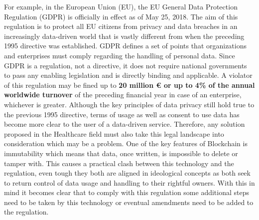 For example, in the European Union (EU), the EU General Data Protection
Regulation (GDPR) is officially in effect as of May 25, 2018. The aim of this
regulation is to protect all EU citizens from privacy and data breaches in an
increasingly data-driven world that is vastly different from when the preceding
1995 directive was established. GDPR defines a set of points that organizations
and enterprises must comply regarding the handling of personal data. Since GDPR
is a regulation, not a directive, it does not require national governments to
pass any enabling legislation and is directly binding and applicable. A
violator of this regulation may be fined up to \textbf{20 million € or up to
4\% of the annual worldwide turnover} of the preceding financial year in case
of an enterprise, whichever is greater. Although the key principles of data
privacy still hold true to the previous 1995 directive, terms of usage as well
as consent to use data has become more clear to the user of a data-driven
service.  Therefore, any solution proposed in the Healthcare field must also
take this legal landscape into consideration which may be a problem. One of the
key features of Blockchain is immutability which means that data, once written,
is impossible to delete or tamper with. This causes a practical clash between
this technology and the regulation, even tough they both are aligned in
ideological concepts as both seek to return control of data usage and handling
to their rightful owners. With this in mind it becomes clear that to comply
with this regulation some additional steps need to be taken by this technology
or eventual amendments need to be added to the regulation.
